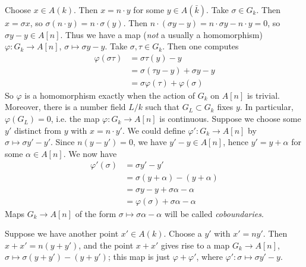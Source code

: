 \documentclass{article}
\begin{document}
Choose $x\in A(k)$. Then $x=n\cdot y$ for some $y\in A(\bar k)$. Take 
$\sigma\in G_k$. Then $x=\sigma x$, so $\sigma(n\cdot y) = n\cdot \sigma(y)$. 
Then $n\cdot (\sigma y - y) = n\cdot \sigma y - n\cdot y = 0$, so 
$\sigma y-y\in A[n]$. Thus we have a map (\emph{not} a usually a homomorphism) 
$\varphi:G_k\to A[n]$, $\sigma\mapsto \sigma y - y$. Take $\sigma,\tau\in G_k$. 
Then one computes 
\begin{align*}
  \varphi(\sigma\tau) &= \sigma\tau(y) - y \\
    &= \sigma(\tau y - y) + \sigma y -y \\
    &= \sigma\varphi(\tau) + \varphi(\sigma)
\end{align*}
So $\varphi$ is a homomorphism exactly when the action of $G_k$ on 
$A[n]$ is trivial. Moreover, there is a number field $L/k$ such that 
$G_L\subset G_k$ fixes $y$. In particular, $\varphi(G_L)=0$, i.e. the map 
$\varphi:G_k\to A[n]$ is continuous. Suppose we choose some $y'$ distinct from 
$y$ with $x=n\cdot y'$. We could define $\varphi':G_k\to A[n]$ by 
$\sigma\mapsto \sigma y'-y'$. Since $n(y-y')=0$, we have $y'-y\in A[n]$, hence 
$y'=y+\alpha$ for some $\alpha\in A[n]$. We now have 
\begin{align*}
  \varphi'(\sigma) &= \sigma y'-y' \\
    &= \sigma(y+\alpha) - (y+\alpha) \\
    &= \sigma y - y + \sigma\alpha-\alpha \\
    &= \varphi(\sigma) + \sigma \alpha-\alpha
\end{align*}
Maps $G_k\to A[n]$ of the form $\sigma\mapsto \sigma \alpha-\alpha$ will be 
called \emph{coboundaries}. 

Suppose we have another point $x'\in A(k)$. Choose a $y'$ with $x'=n y'$. Then 
$x+x'=n(y+y')$, and the point $x+x'$ gives rise to a map $G_k\to A[n]$, 
$\sigma\mapsto \sigma(y+y')-(y+y')$; this map is just $\varphi+\varphi'$, where 
$\varphi':\sigma\mapsto \sigma y'-y$. 
\end{document}
